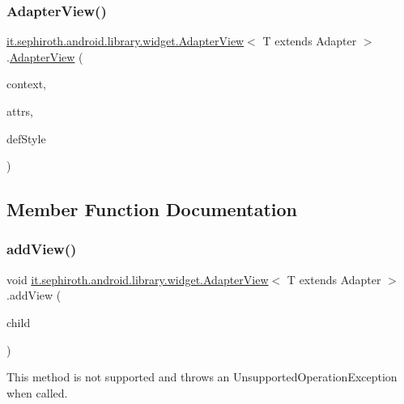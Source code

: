 \subsubsection{\texorpdfstring{Adapter\+View()}{AdapterView()}\hspace{0.1cm}{\footnotesize\ttfamily [3/3]}}
{\footnotesize\ttfamily \hyperlink{classit_1_1sephiroth_1_1android_1_1library_1_1widget_1_1_adapter_view}{it.\+sephiroth.\+android.\+library.\+widget.\+Adapter\+View}$<$ T extends Adapter $>$.\hyperlink{classit_1_1sephiroth_1_1android_1_1library_1_1widget_1_1_adapter_view}{Adapter\+View} (\begin{DoxyParamCaption}\item[{Context}]{context,  }\item[{Attribute\+Set}]{attrs,  }\item[{int}]{def\+Style }\end{DoxyParamCaption})}



\subsection{Member Function Documentation}
\mbox{\label{classit_1_1sephiroth_1_1android_1_1library_1_1widget_1_1_adapter_view_ab2a05b66bf7ed51980f3738fe53e8c36}} 
\subsubsection{\texorpdfstring{add\+View()}{addView()}\hspace{0.1cm}{\footnotesize\ttfamily [1/4]}}
{\footnotesize\ttfamily void \hyperlink{classit_1_1sephiroth_1_1android_1_1library_1_1widget_1_1_adapter_view}{it.\+sephiroth.\+android.\+library.\+widget.\+Adapter\+View}$<$ T extends Adapter $>$.add\+View (\begin{DoxyParamCaption}\item[{View}]{child }\end{DoxyParamCaption})}

This method is not supported and throws an Unsupported\+Operation\+Exception when called.


